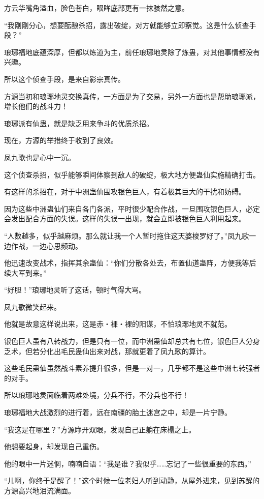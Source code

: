 \begin{this_body}
方云华嘴角溢血，脸色苍白，眼眸底部更有一抹骇然之意。

“我刚刚分心，想要酝酿杀招，露出破绽，对方就能够立即察觉。这是什么侦查手段？”

琅琊福地底蕴深厚，但都以炼道为主，前任琅琊地灵除了炼蛊，对其他事情都没有兴趣。

所以这个侦查手段，是来自影宗真传。

方源当初和琅琊地灵交换真传，一方面是为了交易，另外一方面也是帮助琅琊派，增长他们的战斗力！

琅琊派有仙蛊，就是缺乏用来争斗的优质杀招。

现在，方源的举措终于收到了良效。

凤九歌也是心中一沉。

这个侦查杀招，似乎能够瞬间体察到敌人的破绽，极大地方便蛊仙实施精确打击。

有这样的杀招在，对于中洲蛊仙围攻银色巨人，有着极其巨大的干扰和妨碍。

因为这些中洲蛊仙们来自各门各派，平时很少配合作战，一旦围攻银色巨人，必定会发出配合方面的失误。这样的失误一出现，就会立即被银色巨人利用起来。

“人数越多，似乎越麻烦。那么就让我一个人暂时拖住这天婆梭罗好了。”凤九歌一边作战，一边心思频动。

他迅速改变战术，指挥其余蛊仙：“你们分散各处去，布置仙道蛊阵，方便我等后续大军到来。”

“好胆！”琅琊地灵听了这话，顿时气得大骂。

凤九歌微笑起来。

他就是故意这样说出来，这是赤・裸・裸的阳谋，不怕琅琊地灵不就范。

银色巨人虽有八转战力，但是只有一位，而中洲蛊仙却总共有七位，银色巨人分身乏术，但若分化出毛民蛊仙出来对战，那就更着了凤九歌的算计。

这些毛民蛊仙虽然战斗素养提升很多，但是一对一，几乎都不是这些中洲七转强者的对手。

所以琅琊地灵面临着两难处境，分兵不行，不分兵也不行！

琅琊福地大战激烈的进行着，远在南疆的胎土迷宫之中，却是一片宁静。

“我这是在哪里？”方源睁开双眼，发现自己正躺在床榻之上。

他想要起身，却发现自己重伤。

他的眼中一片迷惘，喃喃自语：“我是谁？我似乎……忘记了一些很重要的东西。”

“儿啊，你终于是醒了！”这个时候一位老妇人听到动静，从屋外进来，见到苏醒的方源高兴地泪流满面。


\end{this_body}
